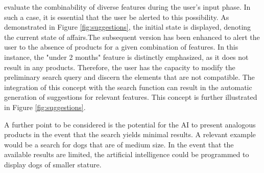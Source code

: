 \documentclass[../../submission.tex]{subfiles}
\begin{document}
 evaluate the combinability of diverse features during the user's input phase. 
 In such a case, it is essential that the user be alerted to this possibility. 
 As demonstrated in Figure \ref{fig:suggestions}, the initial state is displayed, denoting the current 
 state of affairs.The subsequent version has been enhanced to alert the user to the 
 absence of products for a given combination of features. In this instance, the 
 "under 2 months" feature is distinctly emphasized, as it does not result in any products. 
 Therefore, the user has the capacity to modify the preliminary search query and discern the 
 elements that are not compatible. The integration of this concept with the search function 
 can result in the automatic generation of suggestions for relevant features. This concept is 
 further illustrated in Figure \ref{fig:suggestions}.
 
 A further point to be considered is the potential for the AI to present analogous 
 products in the event that the search yields minimal results. A relevant example  
 would be a search for dogs that are of medium size. In the event that the available 
 results are limited, the artificial intelligence could be programmed to display dogs of 
 smaller stature.
 
\end{document}
